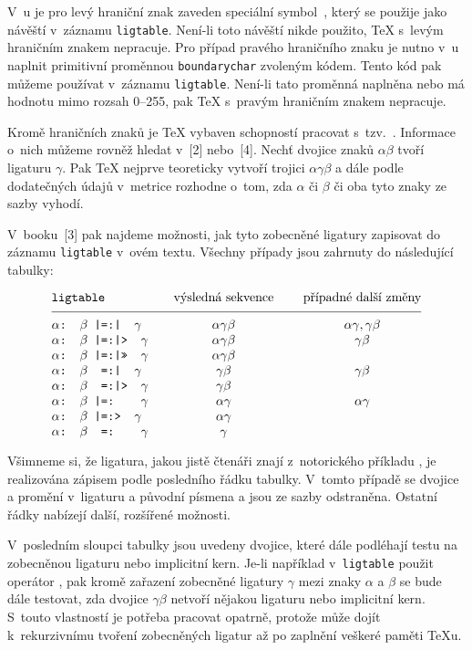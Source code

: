 V~\mf{}u je pro levý hraniční znak zaveden speciální symbol~\uv{{\tt ||:}},
který se použije jako návěští v~záznamu {\tt ligtable}. 
Není-li toto návěští nikde použito, \TeX{} s~levým hraničním znakem
nepracuje. 
Pro případ pravého hraničního znaku je nutno v~\mf{}u naplnit primitivní
proměnnou {\tt boundarychar} zvoleným kódem. Tento kód pak můžeme
používat v~záznamu {\tt ligtable}. Není-li tato proměnná naplněna
nebo má hodnotu mimo rozsah 0--255, pak \TeX{} s~pravým hraničním
znakem nepracuje.

Kromě hraničních znaků je \TeX{} vybaven schopností pracovat
s~tzv.~. Informace o~nich
můžeme rovněž hledat v~[2] nebo~[4].
Nechť dvojice znaků $\alpha\beta$ tvoří ligaturu $\gamma$. Pak
\TeX{} nejprve teoreticky vytvoří trojici $\alpha\gamma\beta$ a dále
podle dodatečných údajů v~metrice
rozhodne o~tom, zda $\alpha$ či $\beta$ či oba tyto znaky
ze sazby vyhodí.

V~\mf{}booku~[3] pak najdeme možnosti, jak tyto zobecněné ligatury
zapisovat do záznamu {\tt ligtable} v~\mf{}ovém textu. Všechny případy
jsou zahrnuty do následující tabulky:

$$\vbox{
\halign{\tt$\alpha$: $\beta$ # $\gamma$\hfil&\hfil\qquad$#$
 \hfil&\qquad\hfil$#$\hfil\cr
 \omit \tt ligtable  & \hbox{výsledná sekvence}
   & \unskip\hbox{případné další změny} \cr
   \noalign{\medskip\hrule\medskip}
     |=:|    &  \alpha\gamma\beta &  \alpha\gamma,  \gamma\beta \cr
     |=:|>   &  \alpha\gamma\beta &  \gamma\beta \cr
     |=:|>>  &  \alpha\gamma\beta &  \cr
    \ =:|    &        \gamma\beta &  \gamma\beta \cr
    \ =:|>   &        \gamma\beta &  \cr
     |=:     &  \alpha\gamma      &  \alpha\gamma \cr
     |=:>    &  \alpha\gamma      &  \cr
    \ =:      &  \gamma            & \cr}
}$$

Všimneme si, že  ligatura, jakou jistě čtenáři znají
z~notorického příkladu , je realizována zápisem \uv{{\tt =:}} podle
posledního řádku tabulky. V~tomto případě se dvojice  a 
promění v~ligaturu  a původní písmena  a  jsou ze
sazby odstraněna. Ostatní řádky nabízejí další, rozšířené možnosti.

V~posledním sloupci tabulky jsou uvedeny dvojice, které dále podléhají
testu na zobecněnou ligaturu nebo implicitní kern. Je-li například
v~{\tt ligtable} použit operátor \uv{{\tt |:=|>}}, pak kromě zařazení zobecněné
ligatury $\gamma$ mezi znaky $\alpha$ a $\beta$ se bude dále testovat, zda
dvojice $\gamma\beta$ netvoří nějakou ligaturu nebo implicitní kern.
S~touto vlastností je potřeba pracovat opatrně, protože může dojít
k~rekurzivnímu tvoření zobecněných ligatur až po zaplnění veškeré paměti
\TeX{}u.

